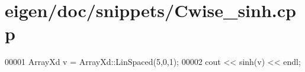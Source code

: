 \hypertarget{eigen_2doc_2snippets_2_cwise__sinh_8cpp_source}{}\section{eigen/doc/snippets/\+Cwise\+\_\+sinh.cpp}
\label{eigen_2doc_2snippets_2_cwise__sinh_8cpp_source}

\begin{DoxyCode}
00001 ArrayXd v = ArrayXd::LinSpaced(5,0,1);
00002 cout << sinh(v) << endl;
\end{DoxyCode}

